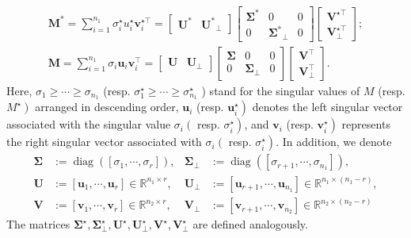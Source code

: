 \documentclass[12pt]{article}
\theoremstyle{remark}
\newcommand{\bs}[1]{{\boldsymbol{#1}^*}}
\newcommand{\bb}[1]{{\boldsymbol {#1}}}
\begin{document}
$$
\begin{gathered}
\bs M=\sum_{i=1}^{n_1} \sigma_i^{\star} u_i^{\star} \boldsymbol{v}_i^{\star \top}=\left[\begin{array}{ll}
\bs U & \bs U_{\perp}
\end{array}\right]\left[\begin{array}{ccc}
\bs \Sigma & 0 & 0 \\
0 & \bs \Sigma_{\perp}& 0
\end{array}\right]\left[\begin{array}{c}
\boldsymbol{V}^{\star \top} \\
\boldsymbol{V}_{\perp}^{\star \top}
\end{array}\right] ; \\
\bb M=\sum_{i=1}^{n_1} \sigma_i \boldsymbol{u}_i \boldsymbol{v}_i^{\top}=\left[\begin{array}{ll} \bb U & \bb U_{\perp}
\end{array}\right]\left[\begin{array}{ccc}
\bb \Sigma & 0 & 0 \\
0 & \boldsymbol{\Sigma}_{\perp} & 0
\end{array}\right]\left[\begin{array}{c}
\boldsymbol{V}^{\top} \\
\boldsymbol{V}_{\perp}^{\top}
\end{array}\right] .
\end{gathered}
$$
Here, $\sigma_1 \geq \cdots \geq \sigma_{n_1}$ (resp. $\sigma_1^{\star} \geq \cdots \geq \sigma_{n_1}^{\star}$ ) stand for the singular values of $M$ (resp. $\left.M^{\star}\right)$ arranged in descending order, $\boldsymbol{u}_i$ (resp. $\left.\boldsymbol{u}_i^{\star}\right)$ denotes the left singular vector associated with the singular value $\sigma_i\left(\right.$ resp. $\left.\sigma_i^{\star}\right)$, and $\boldsymbol{v}_i$ (resp. $\left.\boldsymbol{v}_i^{\star}\right)$ represents the right singular vector associated with $\sigma_i\left(\right.$ resp. $\left.\sigma_i^{\star}\right)$. In addition, we denote
$$
\begin{aligned}
\boldsymbol{\Sigma} &:=\operatorname{diag}\left(\left[\sigma_1, \cdots, \sigma_r\right]\right), & \boldsymbol{\Sigma}_{\perp} &:=\operatorname{diag}\left(\left[\sigma_{r+1}, \cdots, \sigma_{n_1}\right]\right), \\
\boldsymbol{U} &:=\left[\boldsymbol{u}_1, \cdots, \boldsymbol{u}_r\right] \in \mathbb{R}^{n_1 \times r}, & \boldsymbol{U}_{\perp} &:=\left[\boldsymbol{u}_{r+1}, \cdots, \boldsymbol{u}_{n_1}\right] \in \mathbb{R}^{n_1 \times\left(n_1-r\right)}, \\
\boldsymbol{V} &:=\left[\boldsymbol{v}_1, \cdots, \boldsymbol{v}_r\right] \in \mathbb{R}^{n_2 \times r}, & \boldsymbol{V}_{\perp} &:=\left[\boldsymbol{v}_{r+1}, \cdots, \boldsymbol{v}_{n_2}\right] \in \mathbb{R}^{n_2 \times\left(n_2-r\right)}
\end{aligned}
$$
The matrices $\boldsymbol{\Sigma}^{\star}, \boldsymbol{\Sigma}_{\perp}^{\star}, \boldsymbol{U}^{\star}, \boldsymbol{U}_{\perp}^{\star}, \boldsymbol{V}^{\star}, \boldsymbol{V}_{\perp}^{\star}$ are defined analogously.
\end{document}
